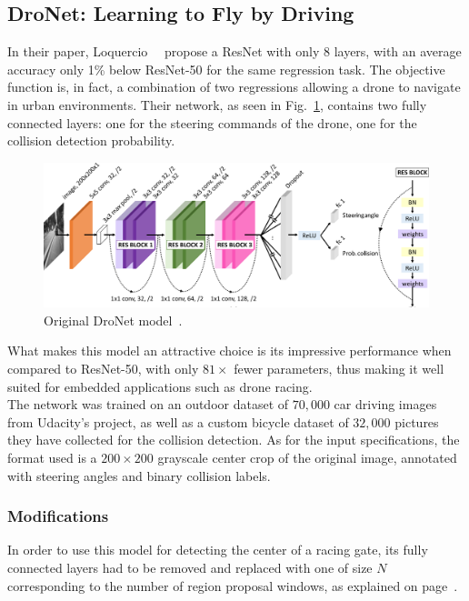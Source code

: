 \subsection{DroNet: Learning to Fly by Driving}

In their paper, Loquercio \etal~\cite{dronet}~propose a ResNet with only 8
layers, with an average accuracy only 1\% below ResNet-50 for the same
regression task. The objective function is, in fact, a combination of two
regressions allowing a drone to navigate in urban environments. Their network,
as seen in Fig.~\ref{fig:dronetoriginal}, contains two fully connected
layers: one for the steering commands of the drone, one for the collision
detection probability.

\begin{figure}[h]
	\center
	\includegraphics[width=\textwidth]{figure/dronet.png}
	\caption{Original DroNet model~\cite{dronet}.}
	\label{fig:dronetoriginal}
\end{figure}

What makes this model an attractive choice is its impressive performance when
compared to ResNet-50, with only $81\times$ fewer parameters, thus making it
well suited for embedded applications such as drone racing.\\

The network was trained on an outdoor dataset of $70,000$ car driving images
from Udacity's project, as well as a custom bicycle dataset of $32,000$
pictures they have collected for the collision detection. As for the input
specifications, the format used is a $200\times200$ grayscale center crop of
the original image, annotated with steering angles and binary collision labels.

\subsubsection{Modifications} \label{section:dronet-mods}

In order to use this model for detecting the center of a racing gate, its fully
connected layers had to be removed and replaced with one of size $N$
corresponding to the number of region proposal windows, as explained on
page~\pageref{fig:regionproposal}. 

